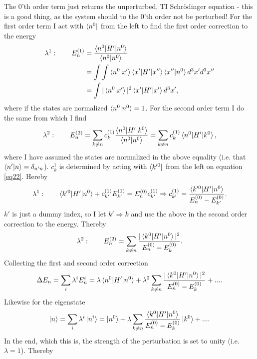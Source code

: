 The $0$'th order term just returns the unperturbed, TI Schrödinger equation - this is a good thing, as the system should to the $0$'th order not be perturbed! For the first order term I act with $\bra{n^0}$ from the left to find the first order correction to the energy
\begin{equation}
	\begin{split}
		\lambda^1:\qquad E_n^{(1)}&=\frac{\braket{n^0|H'|n^0}}{\braket{n^0|n^0}}\\
		&=\int\int\braket{n^0|x'}\braket{x'|H'|x''}\braket{x''|n^0}d^3x'd^3x''\\
		&=\int|\braket{n^0|x'}|^2\braket{x'|H'|x'}d^3x',
	\end{split}
\end{equation} 
where if the states are normalized $\braket{n^0|n^0}=1$. For the second order term I do the same from which I find
\begin{equation}
	\lambda^2:\qquad E_n^{(2)}=\sum_{k\neq n}c_k^{(1)}\frac{\braket{n^0|H'|k^0}}{\braket{n^0|n^0}}=\sum_{k\neq n}c_k^{(1)}\braket{n^0|H'|k^0},
\end{equation} 
where I have assumed the states are normalized in the above equality (i.e. that $\braket{n'|n}=\delta_{n'n}$). $c_k^1$ is determined by acting with $\bra{k'^0}$ from the left on equation \eqref{eq22}. Hereby
\begin{equation}
	\lambda^1:\qquad \braket{k'^0|H'|n^0}+c_{k'}^{(1)}E_{k'}^{(1)}=E_n^{(0)}c_{k'}^{(1)} \Rightarrow c_{k'}^{(1)}=\frac{\braket{k'^0|H'|n^0}}{E_n^{(0)}-E_{k'}^{(0)}}.
\end{equation} 
$k'$ is just a dummy index, so I let $k'\Rightarrow k$ and use the above in the second order correction to the energy. Thereby
\begin{equation}
	\lambda^2:\qquad E_n^{(2)}=\sum_{k\neq n}\frac{|\braket{k^0|H'|n^0}|^2}{E_n^{(0)}-E_k^{(0)}}.
\end{equation} 
Collecting the first and second order correction
\begin{equation}
	\Delta E_n=\sum_{i}\lambda^iE_n^i=\lambda \braket{n^0|H'|n^0}+\lambda^2\sum_{k\neq n}\frac{|\braket{k^0|H'|n^0}|^2}{E_n^{(0)}-E_k^{(0)}}+....
\end{equation} 
Likewise for the eigenstate
\begin{equation}
	\ket{n}=\sum_{i}\lambda^i\ket{n^i}=\ket{n^0}+\lambda\sum_{k\neq n}^{}\frac{\braket{k^0|H'|n^0}}{E_n^{(0)}-E_{k}^{(0)}}\ket{k^0}+....
\end{equation} 
In the end, which this is, the strength of the perturbation is set to unity (i.e. $\lambda=1$). Thereby
